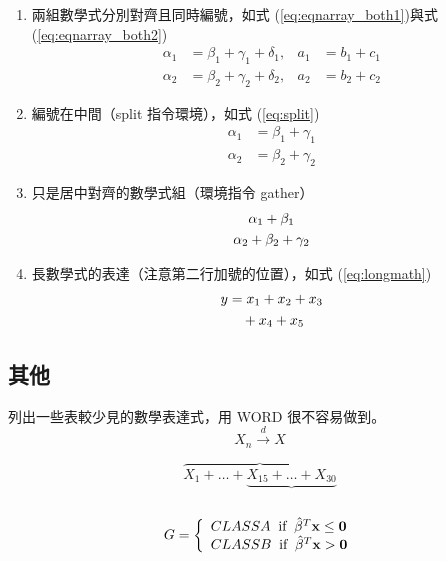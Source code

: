 \documentclass[12pt, a4paper]{article}
\begin{document}
\begin{enumerate}
    \item 兩組數學式分別對齊且同時編號，如式 (\ref{eq:eqnarray_both1})與式(\ref{eq:eqnarray_both2})
    \begin{align}
        \alpha_1 &= \beta_1+\gamma_1+\delta_1, &a_1 &= b_1+c_1 \label{eq:eqnarray_both1}\\
        \alpha_2 &= \beta_2+\gamma_2+\delta_2, &a_2 &= b_2+c_2 \label{eq:eqnarray_both2}
    \end{align}

    \item 編號在中間（{\A split} 指令環境），如式 (\ref{eq:split})
        \begin{equation} 
            \begin{split} \label{eq:split}
                \alpha_1 &= \beta_1+\gamma_1\\
                \alpha_2 &= \beta_2+\gamma_2
            \end{split}
        \end{equation}
    \item 只是居中對齊的數學式組（環境指令 {\A gather}）
        \begin{gather}
        \alpha_1 + \beta_1\notag\\
        \alpha_2 + \beta_2 + \gamma_2\notag
        \end{gather}

    \item 長數學式的表達（注意第二行加號的位置），如式 (\ref{eq:longmath})
        \begin{align}\label{eq:longmath}
            y  	&= x_1 + x_2 + x_3 \notag\\
                	&\quad + x_4 + x_5
        \end{align}
\end{enumerate}

\subsection{其他}
列出一些表較少見的數學表達式，用 WORD 很不容易做到。
  $$X_{n} \stackrel{d}{\longrightarrow} X$$
  
  $$\overbrace{X_{1} + \ldots + \underbrace{X_{15} + \ldots + X_{30}}}$$\\
  \begin{equation*}
    G = \left\{\begin{array}{l}
          CLASS A \;\;\mbox{if} \;\; \hat{\beta}^T\bf{x} \leq 0 \\
          CLASS B \;\;\mbox{if} \;\; \hat{\beta}^T\bf{x} > 0
        \end{array}\right.
  \end{equation*}\\
\end{document}
